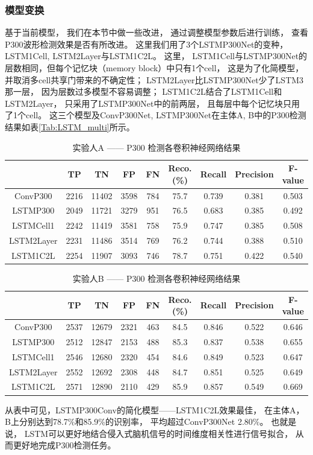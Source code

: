 \subsubsection{模型变换}

基于当前模型， 我们在本节中做一些改进， 通过调整模型参数后进行训练， 查看P300波形检测效果是否有所改进。 这里我们用了3个LSTMP300Net的变种， LSTM1Cell, LSTM2Layer与LSTM1C2L。 这里，  LSTM1Cell与LSTMP300Net的层数相同，但每个记忆块（memory block）中只有1个cell， 这是为了化简模型， 并取消多cell共享门带来的不确定性； LSTM2Layer比LSTMP300Net少了LSTM3那一层， 因为层数过多模型不容易调整； LSTM1C2L结合了LSTM1Cell和LSTM2Layer， 只采用了LSTMP300Net中的前两层， 且每层中每个记忆块只用了1个cell。 这三个模型及ConvP300Net, LSTMP300Net在主体A, B中的P300检测结果如表\ref{Tab:LSTM_multi}所示。

\begin{table}[ht]
\centering
  \caption{实验人A —— P300 检测各卷积神经网络结果}
  \begin{tabular}{|c||c|c|c|c|c|c|c|c|}
  \hline
   & TP & TN & FP & FN & Reco.(\%) & Recall & Precision & F-value \\
  \hline\hline
	ConvP300 & 2216 & 11402 & 3598 & 784 & 75.7  & 0.739  & 0.381  & 0.503 \\
	\hline
	LSTMP300 & 2049&	11721&	3279&	951&	76.5& 	0.683& 	0.385& 	0.492  \\
	\hline
	LSTMCell1 & 2242 & 11419 & 3581 &	758&	75.9 & 0.747 &	0.385& 0.508\\
	\hline
	LSTM2Layer & 2231	&11486&	3514&	769&	76.2& 	0.744& 	0.388& 	0.510 \\
	\hline
	LSTM1C2L & 2254&	11907&	3093&	746&	78.7& 	0.751& 	0.422& 	0.540  \\
	\hline
  \end{tabular}
  \centering \label{tab:p300_cnn_A}
\end{table}


\begin{table}[ht]
\centering
  \caption{实验人B —— P300 检测各卷积神经网络结果}
  \begin{tabular}{|c||c|c|c|c|c|c|c|c|}
  \hline
   & TP & TN & FP & FN & Reco.(\%) & Recall & Precision & F-value \\
  \hline\hline
  	ConvP300 & 2537 & 12679 & 2321 & 463 & 84.5 & 0.846 & 0.522 & 0.646 \\
	\hline
	LSTMP300 & 2512	&12847	&2153	&488	&85.3 &	0.837 &	0.538 &	0.655   \\
	\hline
	LSTMCell1 & 2546&	12680	&2320	&454	&84.6 &	0.849 &	0.523 &	0.647 \\
	\hline
	LSTM2Layer & 2552&	12692&	2308&448	&84.7 &	0.851 	&0.525& 	0.649  \\
	\hline
	LSTM1C2L & 2571	&12890&	2110&	429	&85.9 &	0.857 &	0.549 &	0.669 \\
  \hline
  \end{tabular}
  \centering \label{tab:p300_cnn_B}
\end{table}


从表中可见，LSTMP300Conv的简化模型——LSTM1C2L效果最佳， 在主体A，B上分别达到78.7\%和85.9\%的识别率， 平均超过ConvP300Net 2.80\%。 也就是说， LSTM可以更好地结合侵入式脑机信号的时间维度相关性进行信号拟合， 从而更好地完成P300检测任务。